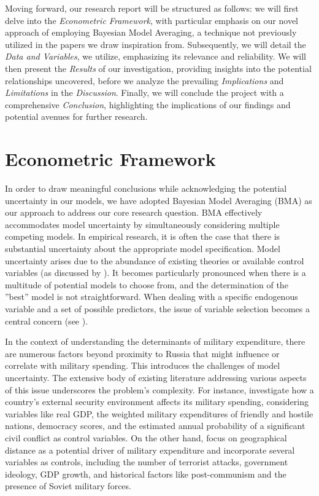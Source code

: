 \documentclass[12pt,a4paper]{article}
\begin{document}
Moving forward, our research report will be structured as follows: we will first delve into the \textit{Econometric Framework}, with particular emphasis on our novel approach of employing Bayesian Model Averaging, a technique not previously utilized in the papers we draw inspiration from. Subsequently, we will detail the \textit{Data and Variables}, we utilize, emphasizing its relevance and reliability. We will then present the \textit{Results} of our investigation, providing insights into the potential relationships uncovered, before we analyze the prevailing \textit{Implications} and \textit{Limitations}   in the \textit{Discussion}. Finally, we will conclude the project with a comprehensive \emph{Conclusion}, highlighting the implications of our findings and potential avenues for further research.

\section{Econometric Framework}
In order to draw meaningful conclusions while acknowledging the potential uncertainty in our models, we have adopted Bayesian Model Averaging (BMA) as our approach to address our core research question. BMA effectively accommodates model uncertainty by simultaneously considering multiple competing models. In empirical research, it is often the case that there is substantial uncertainty about the appropriate model specification. Model uncertainty arises due to the abundance of existing theories or available control variables (as discussed by \citealp{steel2020}). It becomes particularly pronounced when there is a multitude of potential models to choose from, and the determination of the ''best'' model is not straightforward. When dealing with a specific endogenous variable and a set of possible predictors, the issue of variable selection becomes a central concern (see \citealp{clyde2004}). 

In the context of understanding the determinants of military expenditure, there are numerous factors beyond proximity to Russia that might influence or correlate with military spending. This introduces the challenges of model uncertainty. The extensive body of existing literature addressing various aspects of this issue underscores the problem’s complexity. For instance, \citet{nordhaus2012} investigate how a country’s external security environment affects its military spending, considering variables like real GDP, the weighted military expenditures of friendly and hostile nations, democracy scores, and the estimated annual probability of a significant civil conflict as control variables. On the other hand, \citet{kofrovn2023} focus on geographical distance as a potential driver of military expenditure and incorporate several variables as controls, including the number of terrorist attacks, government ideology, GDP growth, and historical factors like post-communism and the presence of Soviet military forces. 
\end{document}
